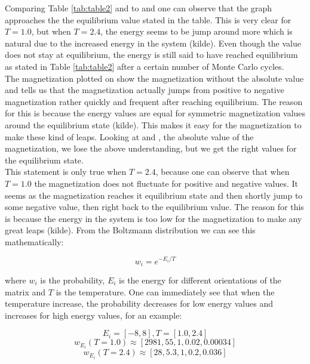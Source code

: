 \documentclass[10pt,a4paper]{article}
\begin{document}
\noindent Comparing Table \ref{tab:table2} and to  and  one can observe that the graph approaches the the equilibrium value stated in the table. This is very clear for $T = 1.0$, but when $T = 2.4$, the energy seems to be jump around more which is natural due to the increased energy in the system (kilde). Even though the value does not stay at equilibrium, the energy is still said to have reached equilibrium as stated in Table \ref{tab:table2} after a certain number of Monte Carlo cycles.
\\
The magnetization plotted on   show the magnetization without the absolute value and tells us that the magnetization actually jumps from positive to negative magnetization rather quickly and frequent after reaching equilibrium. The reason for this is because the energy values are equal for symmetric magnetization values around the equilibrium state (kilde). This makes it easy for the magnetization to make these kind of leaps. Looking at  and , the absolute value of the magnetization, we lose the above understanding, but we get the right values for the equilibrium state.
\\
This statement is only true when $T = 2.4$, because one can observe that when $T = 1.0$ the magnetization does not fluctuate for positive and negative values. It seems as the magnetization reaches it equilibrium state and then shortly jump to some negative value, then right back to the equilibrium value. The reason for this is because the energy in the system is too low for the magnetization to make any great leaps (kilde). From the Boltzmann distribution we can see this mathematically:

$$
w_i = e^{-E_i/T}
$$

\noindent where $w_i$ is the probability, $E_i$ is the energy for different orientations of the matrix and $T$ is the temperature. One can immediately see that when the temperature increase, the probability decreases for low energy values and increases for high energy values, for an example:

$$
E_i = [-8,8] , T = [1.0,2.4]
$$
$$
w_{E_i}(T = 1.0) \approx [2981, 55, 1, 0.02, 0.00034]
$$
$$
w_{E_i}(T = 2.4) \approx [28, 5.3, 1, 0.2, 0.036]
$$
\end{document}
